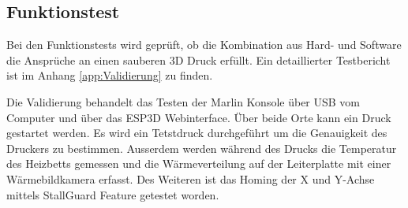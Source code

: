 \subsection{Funktionstest}
\label{sec:Funktionstest}

Bei den Funktionstests wird geprüft, ob die Kombination aus Hard- und Software die Ansprüche an einen sauberen 3D Druck erfüllt. Ein detaillierter Testbericht ist im Anhang \ref{app:Validierung} zu finden.

Die Validierung behandelt das Testen der Marlin Konsole über USB vom Computer und über das ESP3D Webinterface. 
Über beide Orte kann ein Druck gestartet werden. Es wird ein Tetstdruck durchgeführt um die Genauigkeit des Druckers zu bestimmen. Ausserdem werden während des Drucks die Temperatur des Heizbetts gemessen und die Wärmeverteilung auf der Leiterplatte mit einer Wärmebildkamera erfasst. Des Weiteren ist das Homing der X und Y-Achse mittels StallGuard Feature getestet worden.



